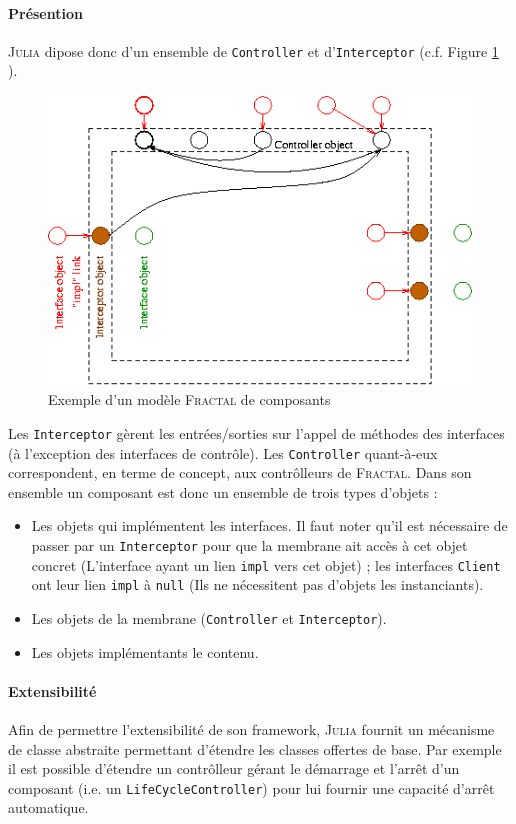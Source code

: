 \documentclass[12pt,a4paper,utf8x]{report}
\newcommand\fractal{\textsc{Fractal}}
\newcommand\julia{\textsc{Julia}}
\begin{document}
\paragraph{Présention}\julia{} dipose donc d'un ensemble de \verb+Controller+ et d'\verb+Interceptor+ (c.f. Figure \ref{fig:Julia} ).
\begin{figure}[htbp] %
  \center
  \includegraphics[scale=0.7]{img/implJ}
  \caption{Exemple d'un modèle \fractal{} de composants} %
 \label{fig:Julia} %
\end{figure} 
Les \verb+Interceptor+ gèrent les entrées/sorties sur l'appel de méthodes des interfaces (à l'exception des interfaces de contrôle). Les \verb+Controller+ quant-à-eux correspondent, en terme de concept, aux contrôlleurs de \fractal. Dans son ensemble un composant est donc un ensemble de trois types d'objets : 
\begin{itemize}
 \item Les objets qui implémentent les interfaces. Il faut noter qu'il est nécessaire de passer par un \verb+Interceptor+ pour que la membrane ait accès à cet objet concret (L'interface ayant un lien \verb+impl+ vers cet objet) ; les interfaces \verb+Client+ ont leur lien \verb+impl+ à \verb+null+ (Ils ne nécessitent pas d'objets les instanciants).
 \item Les objets de la membrane (\verb+Controller+ et \verb+Interceptor+).
 \item Les objets implémentants le contenu.
\end{itemize}

\paragraph{Extensibilité}Afin de permettre l'extensibilité de son framework, \julia{} fournit un mécanisme de classe abstraite permettant d'étendre les classes offertes de base. Par exemple il est possible d'étendre un contrôlleur gérant le démarrage et l'arrêt d'un composant (i.e. un \verb+LifeCycleController+) pour lui fournir une capacité d'arrêt automatique.
\end{document}

